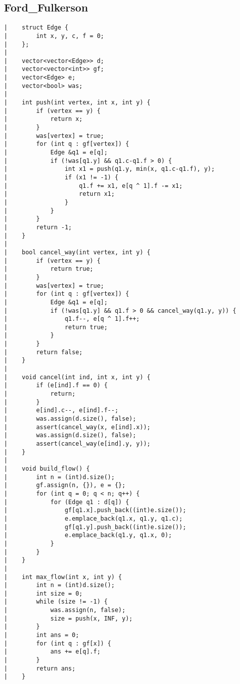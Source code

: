 \documentclass[a4paper, 10pt]{article}
\begin{document}
\begin{center}
\section*{Ford\_Fulkerson}
\begin{verbatim}
|    struct Edge {
|        int x, y, c, f = 0;
|    };
|    
|    vector<vector<Edge>> d;
|    vector<vector<int>> gf;
|    vector<Edge> e;
|    vector<bool> was;
|    
|    int push(int vertex, int x, int y) {
|        if (vertex == y) {
|            return x;
|        }
|        was[vertex] = true;
|        for (int q : gf[vertex]) {
|            Edge &q1 = e[q];
|            if (!was[q1.y] && q1.c-q1.f > 0) {
|                int x1 = push(q1.y, min(x, q1.c-q1.f), y);
|                if (x1 != -1) {
|                    q1.f += x1, e[q ^ 1].f -= x1;
|                    return x1;
|                }
|            }
|        }
|        return -1;
|    }
|    
|    bool cancel_way(int vertex, int y) {
|        if (vertex == y) {
|            return true;
|        }
|        was[vertex] = true;
|        for (int q : gf[vertex]) {
|            Edge &q1 = e[q];
|            if (!was[q1.y] && q1.f > 0 && cancel_way(q1.y, y)) {
|                q1.f--, e[q ^ 1].f++;
|                return true;
|            }
|        }
|        return false;
|    }
|    
|    void cancel(int ind, int x, int y) {
|        if (e[ind].f == 0) {
|            return;
|        }
|        e[ind].c--, e[ind].f--;
|        was.assign(d.size(), false);
|        assert(cancel_way(x, e[ind].x));
|        was.assign(d.size(), false);
|        assert(cancel_way(e[ind].y, y));
|    }
|    
|    void build_flow() {
|        int n = (int)d.size();
|        gf.assign(n, {}), e = {};
|        for (int q = 0; q < n; q++) {
|            for (Edge q1 : d[q]) {
|                gf[q1.x].push_back((int)e.size());
|                e.emplace_back(q1.x, q1.y, q1.c);
|                gf[q1.y].push_back((int)e.size());
|                e.emplace_back(q1.y, q1.x, 0);
|            }
|        }
|    }
|    
|    int max_flow(int x, int y) {
|        int n = (int)d.size();
|        int size = 0;
|        while (size != -1) {
|            was.assign(n, false);
|            size = push(x, INF, y);
|        }
|        int ans = 0;
|        for (int q : gf[x]) {
|            ans += e[q].f;
|        }
|        return ans;
|    }
\end{verbatim}


\end{center}
\end{document}

